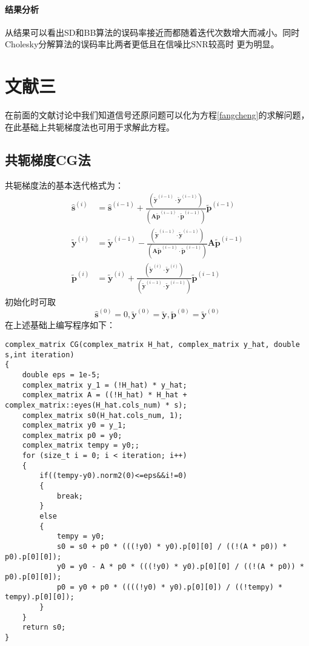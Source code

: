 \documentclass[twocolumn]{ctexart}
\begin{document}
\paragraph{结果分析} 从结果可以看出SD和BB算法的误码率接近而都随着迭代次数增大而减小。同时Cholesky分解算法的误码率比两者更低且在信噪比SNR较高时 更为明显。
\section{文献三}
\par 在前面的文献讨论中我们知道信号还原问题可以化为方程\ref{fangcheng}的求解问题，在此基础上共轭梯度法也可用于求解此方程。
\subsection{共轭梯度CG法}
\par 共轭梯度法的基本迭代格式为：
\[\begin{aligned}
\hat{\mathbf{s}}^{(i)} &=\hat{\mathbf{s}}^{(i-1)}+\frac{\left(\tilde{\mathbf{y}}^{(i-1)} \cdot \tilde{\mathbf{y}}^{(i-1)}\right)}{\left(\mathbf{A} \tilde{\mathbf{p}}^{(i-1)} \cdot \tilde{\mathbf{p}}^{(i-1)}\right)} \tilde{\mathbf{p}}^{(i-1)} \\
\tilde{\mathbf{y}}^{(i)} &=\tilde{\mathbf{y}}^{(i-1)}-\frac{\left(\tilde{\mathbf{y}}^{(i-1)} \cdot \tilde{\mathbf{y}}^{(i-1)}\right)}{\left(\mathbf{A} \tilde{\mathbf{p}}^{(i-1)} \cdot \tilde{\mathbf{p}}^{(i-1)}\right)} \mathbf{A} \tilde{\mathbf{p}}^{(i-1)} \\
\tilde{\mathbf{p}}^{(i)} &=\tilde{\mathbf{y}}^{(i)}+\frac{\left(\tilde{\mathbf{y}}^{(i)} \cdot \tilde{\mathbf{y}}^{(i)}\right)}{\left(\tilde{\mathbf{y}}^{(i-1)} \cdot \tilde{\mathbf{y}}^{(i-1)}\right)} \tilde{\mathbf{p}}^{(i-1)}
\end{aligned}\]
初始化时可取\[\hat{\mathbf{s}}^{(0)}=0, \tilde{\mathbf{y}}^{(0)}=\tilde{\mathbf{y}}, \tilde{\mathbf{p}}^{(0)}=\tilde{\mathbf{y}}^{(0)}\]
在上述基础上编写程序如下：
\begin{lstlisting}
complex_matrix CG(complex_matrix H_hat, complex_matrix y_hat, double s,int iteration)
{
	double eps = 1e-5;
	complex_matrix y_1 = (!H_hat) * y_hat;
	complex_matrix A = ((!H_hat) * H_hat + complex_matrix::eyes(H_hat.cols_num) * s);
	complex_matrix s0(H_hat.cols_num, 1);
	complex_matrix y0 = y_1;
	complex_matrix p0 = y0;
	complex_matrix tempy = y0;;
	for (size_t i = 0; i < iteration; i++)
	{
		if((tempy-y0).norm2(0)<=eps&&i!=0)
		{
			break;
		}
		else
		{
			tempy = y0;
			s0 = s0 + p0 * (((!y0) * y0).p[0][0] / ((!(A * p0)) * p0).p[0][0]);
			y0 = y0 - A * p0 * (((!y0) * y0).p[0][0] / ((!(A * p0)) * p0).p[0][0]);
			p0 = y0 + p0 * ((((!y0) * y0).p[0][0]) / ((!tempy) * tempy).p[0][0]);
		}
	}
	return s0;
}
\end{lstlisting}
\end{document}
